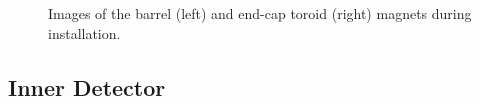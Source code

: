 \begin{figure}[htbp]
	\centering
	\hfill
	\caption{Images of the barrel (left) and end-cap toroid (right) magnets during installation.}
	\label{fig:ATLAS-toroids}
\end{figure}




\subsection{Inner Detector}\label{sec:ATLAS-inner-detector}

